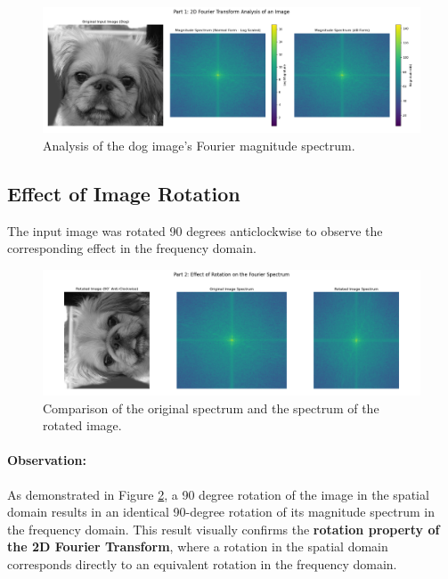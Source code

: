 \documentclass[11pt, a4paper]{article}
\begin{document}
\begin{figure}[H]
    \centering
    \includegraphics[width=\textwidth]{q1_part1_spectra_analysis.png}
    \caption{Analysis of the dog image's Fourier magnitude spectrum.}
    \label{fig:spectra}
\end{figure}

\subsection{Effect of Image Rotation}
The input image was rotated 90 degrees anticlockwise to observe the corresponding effect in the frequency domain.

\begin{figure}[H]
    \centering
    \includegraphics[width=\textwidth]{q1_part2_rotation_analysis.png}
    \caption{Comparison of the original spectrum and the spectrum of the rotated image.}
    \label{fig:rotation}
\end{figure}

\paragraph{Observation:} As demonstrated in Figure \ref{fig:rotation}, a 90 degree rotation of the image in the spatial domain results in an identical 90-degree rotation of its magnitude spectrum in the frequency domain. This result visually confirms the \textbf{rotation property of the 2D Fourier Transform}, where a rotation in the spatial domain corresponds directly to an equivalent rotation in the frequency domain.

\end{document}
